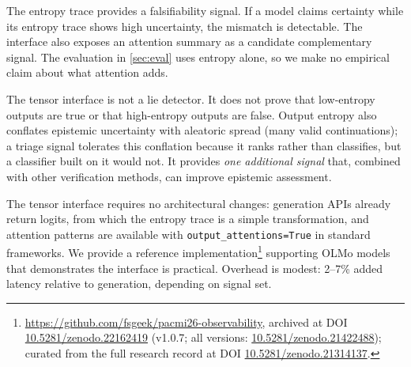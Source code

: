 The entropy trace provides a falsifiability signal. If a model claims certainty
while its entropy trace shows
high uncertainty, the mismatch is detectable. The interface also exposes an
attention summary as a candidate complementary signal. The evaluation in
\autoref{sec:eval} uses entropy alone, so we make no empirical claim about
what attention adds.

The tensor interface is not a lie detector. It does not prove that low-entropy
outputs are true or that high-entropy outputs are false. Output entropy also
conflates epistemic uncertainty with aleatoric spread (many valid
continuations); a triage signal tolerates this conflation because it ranks
rather than classifies, but a classifier built on it would not. It provides
\emph{one additional signal} that, combined with other verification methods,
can improve epistemic assessment.

The tensor interface requires no architectural changes: generation APIs
already return logits, from which the entropy trace is a simple
transformation, and attention patterns are available with
\texttt{\small{output\_attentions=True}} in standard frameworks.
We provide a reference implementation\footnote{\url{https://github.com/fsgeek/pacmi26-observability},
archived at DOI \href{https://doi.org/10.5281/zenodo.22162419}{10.5281/zenodo.22162419}
(v1.0.7; all versions: \href{https://doi.org/10.5281/zenodo.21422488}{10.5281/zenodo.21422488});
curated from the full research record at DOI
\href{https://doi.org/10.5281/zenodo.21314137}{10.5281/zenodo.21314137}.}
supporting OLMo models that demonstrates
the interface is practical. Overhead is modest: 2--7\% added latency relative to
generation, depending on signal set.




